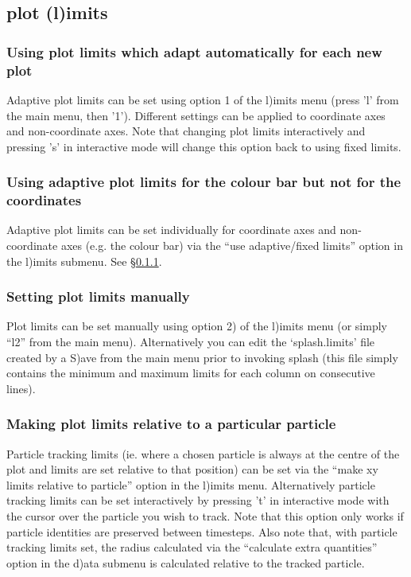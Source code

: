 \documentclass[a4paper,11pt]{article}
\begin{document}
\subsection{plot (l)imits}

\subsubsection{ Using plot limits which adapt automatically for each new plot}
\label{sec:adapt}
 Adaptive plot limits can be set using option 1 of the l)imits menu (press 'l' from the main menu, then '1'). Different settings can be applied to coordinate axes and non-coordinate axes. Note that changing plot limits interactively and pressing 's' in interactive mode will change this option back to using fixed limits.

\subsubsection{ Using adaptive plot limits for the colour bar but not for the coordinates}
 Adaptive plot limits can be set individually for coordinate axes and non-coordinate axes (e.g. the colour bar) via the ``use adaptive/fixed limits'' option in the l)imits submenu. See \S\ref{sec:adapt}. 

\subsubsection{ Setting plot limits manually}
 Plot limits can be set manually using option 2) of the l)imits menu (or simply ``l2'' from the main menu). Alternatively you can edit the `splash.limits' file created by a S)ave from the main menu prior to invoking splash (this file simply contains the minimum and maximum limits for each column on consecutive lines).

\subsubsection{ Making plot limits relative to a particular particle}
\label{sec:track}
 Particle tracking limits (ie. where a chosen particle is always at the centre of the plot and limits are set relative to that position) can be set via the ``make xy limits relative to particle'' option in the l)imits menu. Alternatively particle tracking limits can be set interactively by pressing 't' in interactive mode with the cursor over the particle you wish to track. Note that this option only works if particle identities are preserved between timesteps. Also note that, with particle tracking limits set, the radius calculated via the ``calculate extra quantities'' option in the d)ata submenu is calculated relative to the tracked particle.
\end{document}
